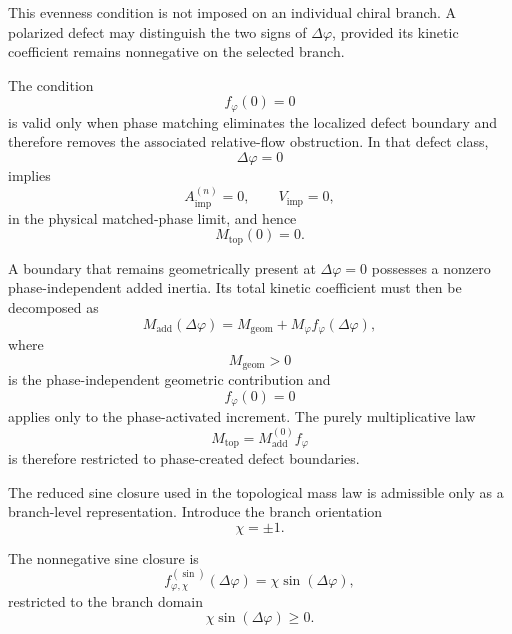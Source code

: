 This evenness condition is not imposed on an individual chiral branch. A polarized defect may distinguish the two signs of $\Delta\varphi$, provided its kinetic coefficient remains nonnegative on the selected branch.

The condition
\begin{equation}
    f_{\varphi}(0) = 0
\end{equation}
is valid only when phase matching eliminates the localized defect boundary and therefore removes the associated relative-flow obstruction. In that defect class,
\begin{equation}
    \Delta\varphi = 0
\end{equation}
implies
\begin{equation}
    A_{\mathrm{imp}}^{(n)} = 0, \qquad V_{\mathrm{imp}} = 0,
\end{equation}
in the physical matched-phase limit, and hence
\begin{equation}
    M_{\mathrm{top}}(0) = 0.
\end{equation}

A boundary that remains geometrically present at $\Delta\varphi=0$ possesses a nonzero phase-independent added inertia. Its total kinetic coefficient must then be decomposed as
\begin{equation}
    M_{\mathrm{add}}(\Delta\varphi) = M_{\mathrm{geom}} + M_{\varphi} f_{\varphi}(\Delta\varphi),
\end{equation}
where
\begin{equation}
    M_{\mathrm{geom}} > 0
\end{equation}
is the phase-independent geometric contribution and
\begin{equation}
    f_{\varphi}(0) = 0
\end{equation}
applies only to the phase-activated increment. The purely multiplicative law
\begin{equation}
    M_{\mathrm{top}} = M_{\mathrm{add}}^{(0)} f_{\varphi}
\end{equation}
is therefore restricted to phase-created defect boundaries.

The reduced sine closure used in the topological mass law is admissible only as a branch-level representation. Introduce the branch orientation
\begin{equation}
    \chi = \pm 1.
\end{equation}

The nonnegative sine closure is
\begin{equation}
    f_{\varphi,\chi}^{(\sin)}(\Delta\varphi) = \chi\sin(\Delta\varphi),
\end{equation}
restricted to the branch domain
\begin{equation}
    \chi\sin(\Delta\varphi) \geq 0.
\end{equation}

